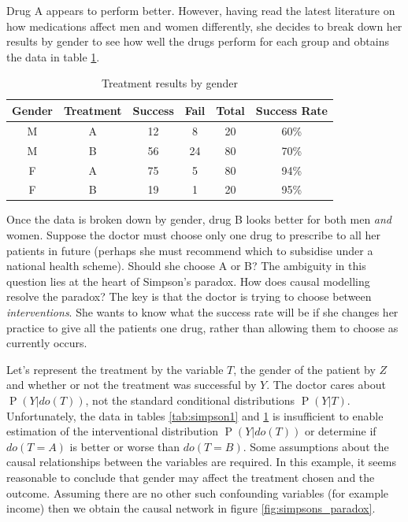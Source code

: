\documentclass[11pt,a4paper,oneside]{book}
\renewcommand{\P}[1]{\operatorname{P}\left(#1\right)}
\theoremstyle{plain}
\theoremstyle{definition}
\begin{document}
Drug A appears to perform better. However, having read the latest literature on how medications affect men and women differently, she decides to break down her results by gender to see how well the drugs perform for each group and obtains the data in table \ref{tab:simpson2}.

\begin{table}[h]
\caption{Treatment results by gender}
\label{tab:simpson2}
\center
\begin{tabular}{c c c c c c}
Gender & Treatment & Success & Fail & Total & Success Rate\\
\hline
\rowcolor[gray]{0.9}
M & A & 12 & 8 & 20 & 60\%\\
M & B & 56 & 24 & 80 & 70\%\\
\rowcolor[gray]{0.9}
F & A & 75 & 5 & 80 & 94\%\\
F & B & 19 & 1 & 20 & 95\%\\
\hline
\end{tabular}
\end{table}

Once the data is broken down by gender, drug B looks better for both men \emph{and} women. Suppose the doctor must choose only one drug to prescribe to all her patients in future (perhaps she must recommend which to subsidise under a national health scheme). Should she choose A or B? The ambiguity in this question lies at the heart of Simpson's paradox. How does causal modelling resolve the paradox? The key is that the doctor is trying to choose between \emph{interventions}. She wants to know what the success rate will be if she changes her practice to give all the patients one drug, rather than allowing them to choose as currently occurs. 

Let's represent the treatment by the variable $T$, the gender of the patient by $Z$ and whether or not the treatment was successful by $Y$. The doctor cares about $\P{Y|do(T)}$, not the standard conditional distributions $\P{Y|T}$. Unfortunately, the data in tables \ref{tab:simpson1} and \ref{tab:simpson2} is insufficient to enable estimation of the interventional distribution $\P{Y|do(T)}$ or determine if $do(T=A)$ is better or worse than $do(T=B)$. Some assumptions about the causal relationships between the variables are required. In this example, it seems reasonable to conclude that gender may affect the treatment chosen and the outcome. Assuming there are no other such confounding variables (for example income) then we obtain the causal network in figure \ref{fig:simpsons_paradox}.
\end{document}
